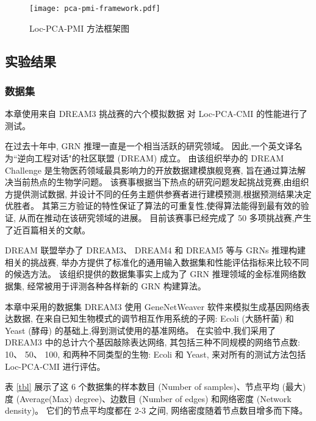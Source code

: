 \begin{figure}[!htbp]
  \centering
  \texttt{[image: pca-pmi-framework.pdf]}
  \caption{Loc-PCA-PMI 方法框架图}
  \label{pca-pmi-fr}
\end{figure}


\subsection{实验结果}

\subsubsection{数据集}
\label{subsubsec:loc-dataset}

本章使用来自 DREAM3 挑战赛的六个模拟数据  对 Loc-PCA-CMI 的性能进行了测试。

在过去十年中, GRN 推理一直是一个相当活跃的研究领域。
因此,一个英文译名为``逆向工程对话"的社区联盟 (DREAM)  成立。
由该组织举办的 DREAM Challenge 是生物医药领域最具影响力的开放数据建模旗舰竞赛,
旨在通过算法解决当前热点的生物学问题。
该赛事根据当下热点的研究问题发起挑战竞赛,由组织方提供测试数据,
并设计不同的任务主题供参赛者进行建模预测,根据预测结果决定优胜者。
其第三方验证的特性保证了算法的可重复性,使得算法能得到最有效的验证,
从而在推动在该研究领域的进展。
目前该赛事已经完成了 50 多项挑战赛,产生了近百篇相关的文献。

DREAM 联盟举办了 DREAM3、
DREAM4 和 DREAM5 等与 GRNs 推理构建相关的挑战赛, 
举办方提供了标准化的通用输入数据集和性能评估指标来比较不同的候选方法。
该组织提供的数据集事实上成为了 GRN 推理领域的金标准网络数据集,
经常被用于评测各种各样新的 GRN 构建算法。

本章中采用的数据集 DREAM3 使用 GeneNetWeaver 软件来模拟生成基因网络表达数据,
在来自已知生物模式的调节相互作用系统的子网:
 Ecoli (大肠杆菌) 和 Yeast (酵母) 的基础上,得到测试使用的基准网络。 
在实验中,我们采用了 DREAM3 中的总计六个基因敲除表达网络,
其包括三种不同规模的网络节点数: 10、 50、 100, 和两种不同类型的生物: Ecoli 和 Yeast, 
来对所有的测试方法包括 Loc-PCA-CMI 进行评估。

表 \ref{tbl} 展示了这 6 个数据集的样本数目 (Number of samples)、节点平均 (最大)度 (Average(Max) degree)、边数目 (Number of edges) 和网络密度 (Network density)。
它们的节点平均度都在 2-3 之间, 网络密度随着节点数目增多而下降。

